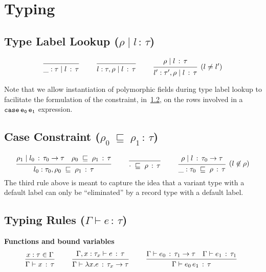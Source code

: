 \documentclass{article}
\newcommand{\G}{\Gamma}
\newcommand{\case}[2]{\tt{case}\,#1\,#2}
\newcommand{\app}[2]{#1\,#2}
\newcommand{\lam}[2]{\lambda #1 . #2}
\newcommand{\hastp}[3]{#1 \vdash #2 \,:\, #3}
\newcommand{\haslbl}[3]{#1\;|\;#2\,:\, #3}
\newcommand{\caseVarRcd}[3]{#1 \;\sqsubseteq\; #2 \,:\, #3}
\newcommand{\deduct}[3][]
{
  \begin{prooftree}
    \hypo{#2}
    \infer1[\text{#1}]{#3}
  \end{prooftree}
}
\begin{document}
\section{Typing}

\subsection{Type Label Lookup \;($\haslbl{\rho}{l}{\tau}$)}
\label{subsec:type-lookup}
\[
\deduct
    {}
    {\haslbl{\_ : \tau}{l}{\tau}}
    {}
\qquad
\deduct
    {}
    {\haslbl{l:\tau,\rho}{l}{\tau}}
    {}
\qquad
\deduct
    {\haslbl{\rho}{l}{\tau}}
    {\haslbl{l':\tau',\rho}{l}{\tau}}
    {(l \neq l')}
\]

Note that we allow instantiation of polymorphic fields during type
label lookup to facilitate the formulation of the constraint, in~\ref{subsec:case-constraint}, on
the rows involved in a $\case{e_0}{e_1}$ expression.

\subsection{Case Constraint \;($\caseVarRcd{\rho_0}{\rho_1}{\tau}$)}
\label{subsec:case-constraint}
\[
\deduct
    {\haslbl{\rho_1}{l_0}{\tau_0\to\tau} \quad \caseVarRcd{\rho_0}{\rho_1}{\tau}}
    {\caseVarRcd{l_0:\tau_0,\rho_0}{\rho_1}{\tau}}
    {}
\qquad
\deduct
    {}
    {\caseVarRcd{\cdot}{\rho}{\tau}}
    {}
\qquad
\deduct
    {\haslbl{\rho}{l}{\tau_0\to\tau}}
    {\caseVarRcd{\_:\tau_0}{\rho}{\tau}}
    {(l\not\in\rho)}
\]
The third rule above is meant to capture the idea that a variant type
with a default label can only be ``eliminated'' by a record type with a
default label.

\subsection{Typing Rules \;($\hastp{\G}{e}{\tau}$)}

\textbf{Functions and bound variables}
\[
\deduct
    {x:\tau \in \G}
    {\hastp{\G}{x}{\tau}}
    {}
\qquad
\deduct
    {\hastp{\G,x:\tau_x}{e}{\tau}}
    {\hastp{\G}{\lam{x}{e}}{\tau_x\to\tau}}
    {}
\qquad
\deduct
    {\hastp{\G}{e_0}{\tau_1\to\tau}
     \quad
     \hastp{\G}{e_1}{\tau_1}
    }
    {\hastp{\G}{\app{e_0}{e_1}}{\tau}}
    {}
\]
\end{document}
